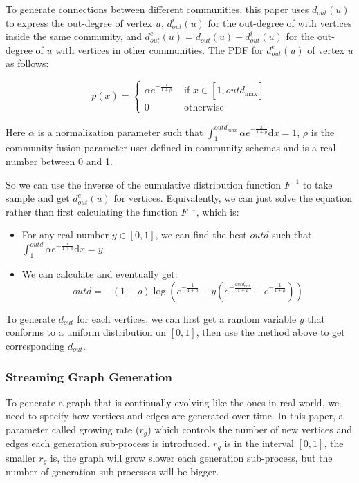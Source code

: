 \begin{survey}
To generate connections between different communities, this paper uses
\(d_{out}(u)\) to express the out-degree of vertex \(u\),
\(d_{out}^i(u)\) for the out-degree of with vertices inside the same
community, and \(d_{out}^e(u) = d_{out}(u) - d_{out}^i(u)\) for the
out-degree of \(u\) with vertices in other communities. The PDF for
\(d_{out}^e(u)\) of vertex \(u\) as follows:

\[p(x)=\left\{\begin{array}{ll}
{\alpha e^{-\frac{x}{1+\rho}}} & {\text { if } x \in\left[1, outd_{\max }^{\prime}\right]} \\
{0} & {\text { otherwise }}
\end{array}\right.\]

Here \(\alpha\) is a normalization parameter such that
\(\int_{1}^{o u t d_{m a x}^{\prime}} \alpha e^{-\frac{x}{1+\rho}} \mathrm{d} x=1\),
\(\rho\) is the community fusion parameter user-defined in community
schemas and is a real number between 0 and 1.

So we can use the inverse of the cumulative distribution function
\(F^{-1}\) to take sample and get \(d_{out}^e(u)\) for vertices.
Equivalently, we can just solve the equation rather than first
calculating the function \(F^{-1}\), which is:

\begin{itemize}
\item
  For any real number \(y \in [0,1]\), we can find the best \(outd\)
  such that
  \(\int_{1}^{o u t d} \alpha e^{-\frac{x}{1+\rho}} \mathrm{d} x=y\).
\item
  We can calculate and eventually get:
  \[outd =-(1+\rho) \log \left(e^{-\frac{1}{1+\rho}}+y\left(e^{-\frac{o u t d_{\max }^{\prime}}{1+\rho}}-e^{-\frac{1}{1+\rho}}\right)\right)\]
\end{itemize}

\vspace{0.2cm}

To generate \(d_{out}\) for each vertices, we can first get a random
variable \(y\) that conforms to a uniform distribution on \([0,1]\),
then use the method above to get corresponding \(d_{out}\).

\subsubsection{Streaming Graph Generation}

To generate a graph that is continually evolving like the ones in
real-world, we need to specify how vertices and edges are generated over
time. In this paper, a parameter called growing rate (\(r_g\)) which
controls the number of new vertices and edges each generation
sub-process is introduced. \(r_g\) is in the interval \([0,1]\), the
smaller \(r_g\) is, the graph will grow slower each generation
sub-process, but the number of generation sub-processes will be bigger.


\end{survey}
